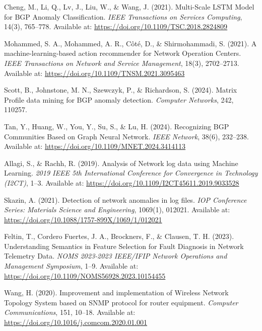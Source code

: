 \documentclass[11pt]{article}
\begin{document}
\begin{thebibliography}{9}

Cheng, M., Li, Q., Lv, J., Liu, W., \& Wang, J. (2021).
Multi-Scale LSTM Model for BGP Anomaly Classification.
\textit{IEEE Transactions on Services Computing}, 14(3), 765--778.
Available at: \href{https://doi.org/10.1109/TSC.2018.2824809}{https://doi.org/10.1109/TSC.2018.2824809}

Mohammed, S. A., Mohammed, A. R., Côté, D., \& Shirmohammadi, S. (2021).
A machine-learning-based action recommender for Network Operation Centers.
\textit{IEEE Transactions on Network and Service Management}, 18(3), 2702--2713.
Available at: \href{https://doi.org/10.1109/TNSM.2021.3095463}{https://doi.org/10.1109/TNSM.2021.3095463}

Scott, B., Johnstone, M. N., Szewczyk, P., \& Richardson, S. (2024).
Matrix Profile data mining for BGP anomaly detection.
\textit{Computer Networks}, 242, 110257.

Tan, Y., Huang, W., You, Y., Su, S., \& Lu, H. (2024).
Recognizing BGP Communities Based on Graph Neural Network.
\textit{IEEE Network}, 38(6), 232--238.
Available at: \href{https://doi.org/10.1109/MNET.2024.3414113}{https://doi.org/10.1109/MNET.2024.3414113}

Allagi, S., \& Rachh, R. (2019).
Analysis of Network log data using Machine Learning.
\textit{2019 IEEE 5th International Conference for Convergence in Technology (I2CT)}, 1--3.
Available at: \href{https://doi.org/10.1109/I2CT45611.2019.9033528}{https://doi.org/10.1109/I2CT45611.2019.9033528}

Skazin, A. (2021).
Detection of network anomalies in log files.
\textit{IOP Conference Series: Materials Science and Engineering}, 1069(1), 012021.
Available at: \href{https://doi.org/10.1088/1757-899X/1069/1/012021}{https://doi.org/10.1088/1757-899X/1069/1/012021}

Feltin, T., Cordero Fuertes, J. A., Brockners, F., \& Clausen, T. H. (2023).
Understanding Semantics in Feature Selection for Fault Diagnosis in Network Telemetry Data.
\textit{NOMS 2023-2023 IEEE/IFIP Network Operations and Management Symposium}, 1--9.
Available at: \href{https://doi.org/10.1109/NOMS56928.2023.10154455}{https://doi.org/10.1109/NOMS56928.2023.10154455}

Wang, H. (2020).
Improvement and implementation of Wireless Network Topology System based on SNMP protocol for router equipment.
\textit{Computer Communications}, 151, 10--18.
Available at: \href{https://doi.org/10.1016/j.comcom.2020.01.001}{https://doi.org/10.1016/j.comcom.2020.01.001}


\end{thebibliography}
\end{document}
